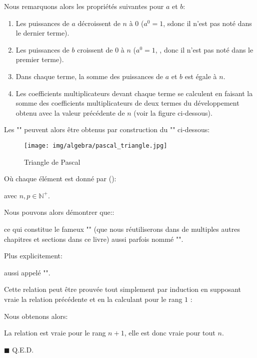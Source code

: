 	Nous remarquons alors les propriétés suivantes pour $a$ et $b$:
	\begin{enumerate}
		\item  Les puissances de $a$ décroissent de $n$ à $0$ ($a^0=1$, sdonc il n'est pas noté dans le dernier terme).
		
		\item  Les puissances de $b$ croissent de $0$ à $n$ ($a^0=1$, , donc il n'est pas noté dans le premier terme).
		
		\item Dans chaque terme, la somme des puissances de $a$ et $b$ est égale à $n$.
		
		\item Les coefficients multiplicateurs devant chaque terme se calculent en faisant la somme des coefficients multiplicateurs de deux termes du développement obtenu avec la valeur précédente de $n$ (voir la figure ci-dessous). 
	\end{enumerate}
	Les "" peuvent alors être obtenus par construction du "\label{Pascal's triangle}" ci-dessous:
	\begin{figure}[H]
		\centering
		\texttt{[image: img/algebra/pascal\_triangle.jpg]}
		\caption{Triangle de Pascal}
	\end{figure}
	Où chaque élément est donné par ():
	
	avec $n,p\in \mathbb{N}^{+}$.
	\begin{theorem}
	Nous pouvons alors démontrer que:\label{binomial theorem}:
	
	ce qui constitue le fameux "" (que nous réutiliserons dans de multiples autres chapitres et sections dans ce livre) aussi parfois nommé "".
	
	Plus explicitement\label{binomial coefficient development}:
	
	aussi appelé "".
	\end{theorem}
	\begin{dem}
	Cette relation peut être prouvée tout simplement par induction en supposant vraie la relation précédente et en la calculant pour le rang $1$ :
	
	Nous obtenons alors:
	
	La relation est vraie pour le rang $n + 1$, elle est donc vraie pour tout $n$.
	\begin{flushright}
		$\blacksquare$  Q.E.D.
	\end{flushright}
	\end{dem} 
	
